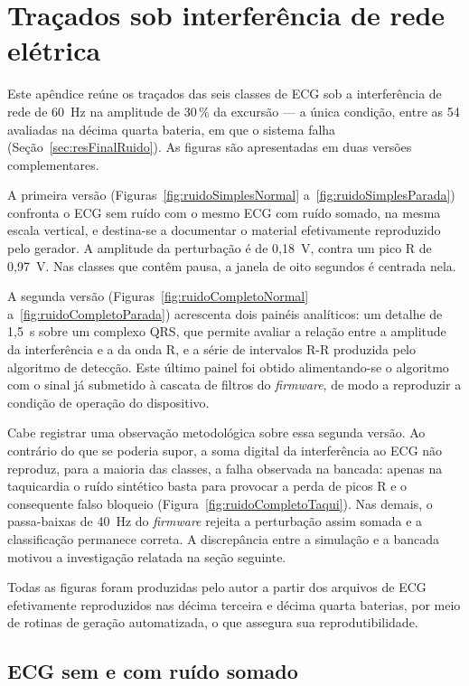 \chapter{Traçados sob interferência de rede elétrica}
\label{ap:figurasRuido}

Este apêndice reúne os traçados das seis classes de \acs{ECG} sob a interferência de rede de 60~Hz na amplitude de 30\,\% da excursão --- a única condição, entre as 54 avaliadas na décima quarta bateria, em que o sistema falha (Seção~\ref{sec:resFinalRuido}). As figuras são apresentadas em duas versões complementares.

A primeira versão (Figuras~\ref{fig:ruidoSimplesNormal} a~\ref{fig:ruidoSimplesParada}) confronta o \acs{ECG} sem ruído com o mesmo \acs{ECG} com ruído somado, na mesma escala vertical, e destina-se a documentar o material efetivamente reproduzido pelo gerador. A amplitude da perturbação é de 0,18~V, contra um pico R de 0,97~V. Nas classes que contêm pausa, a janela de oito segundos é centrada nela.

A segunda versão (Figuras~\ref{fig:ruidoCompletoNormal} a~\ref{fig:ruidoCompletoParada}) acrescenta dois painéis analíticos: um detalhe de 1,5~s sobre um complexo QRS, que permite avaliar a relação entre a amplitude da interferência e a da onda R, e a série de intervalos R-R produzida pelo algoritmo de detecção. Este último painel foi obtido alimentando-se o algoritmo com o sinal já submetido à cascata de filtros do \textit{firmware}, de modo a reproduzir a condição de operação do dispositivo.

Cabe registrar uma observação metodológica sobre essa segunda versão. Ao contrário do que se poderia supor, a soma digital da interferência ao \acs{ECG} não reproduz, para a maioria das classes, a falha observada na bancada: apenas na taquicardia o ruído sintético basta para provocar a perda de picos R e o consequente falso bloqueio (Figura~\ref{fig:ruidoCompletoTaqui}). Nas demais, o passa-baixas de 40~Hz do \textit{firmware} rejeita a perturbação assim somada e a classificação permanece correta. A discrepância entre a simulação e a bancada motivou a investigação relatada na seção seguinte.

Todas as figuras foram produzidas pelo autor a partir dos arquivos de \acs{ECG} efetivamente reproduzidos nas décima terceira e décima quarta baterias, por meio de rotinas de geração automatizada, o que assegura sua reprodutibilidade.

\section{ECG sem e com ruído somado}

